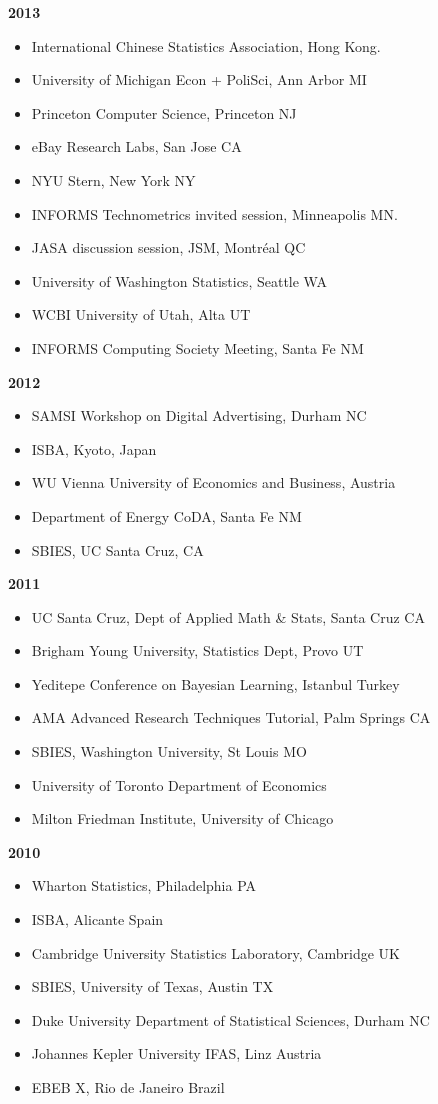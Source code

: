 \documentclass[margin,line]{res}
\begin{document}
\begin{resume}
{\bf 2013}
\begin{itemize}
\item International Chinese Statistics Association, Hong Kong.
\item University of Michigan Econ + PoliSci, Ann Arbor MI
\item Princeton Computer Science, Princeton NJ
\item eBay Research Labs, San Jose CA
\item NYU Stern, New York NY
\item INFORMS Technometrics invited session, Minneapolis MN.
\item JASA discussion session, JSM, Montr\'eal QC
\item University of Washington Statistics, Seattle WA
\item WCBI University of Utah, Alta UT
\item INFORMS Computing Society Meeting, Santa Fe NM
\end{itemize}

{\bf 2012}
\begin{itemize}
\item SAMSI Workshop on Digital Advertising, Durham NC
\item ISBA, Kyoto, Japan
\item WU Vienna University of Economics and Business, Austria
\item Department of Energy CoDA, Santa Fe NM
\item SBIES, UC Santa Cruz, CA
\end{itemize}



{\bf 2011}
\begin{itemize}
\item UC Santa Cruz, Dept of Applied Math \& Stats, Santa Cruz CA
\item Brigham Young University, Statistics Dept, Provo UT
\item Yeditepe Conference on Bayesian Learning, Istanbul Turkey
\item AMA Advanced Research Techniques Tutorial,  Palm Springs CA
\item SBIES, Washington University, St Louis MO
\item University of Toronto Department of Economics
\item Milton Friedman Institute, University of Chicago
\end{itemize}


{\bf 2010}
\begin{itemize}
\item Wharton Statistics, Philadelphia PA
\item ISBA, Alicante Spain
\item Cambridge University Statistics Laboratory, Cambridge UK
\item SBIES, University of Texas, Austin TX
\item Duke University Department of Statistical Sciences, Durham NC
\item Johannes Kepler University IFAS, Linz Austria
\item EBEB X, Rio de Janeiro Brazil
\end{itemize}


\end{resume}
\end{document}
